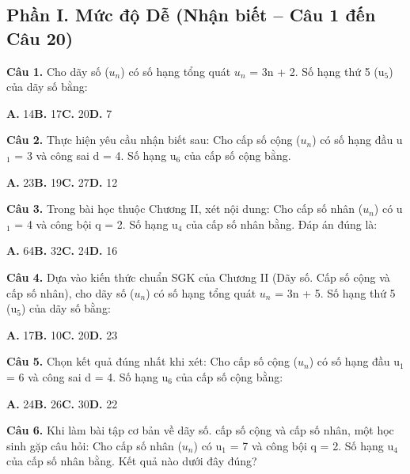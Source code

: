 \documentclass[11pt,a4paper]{article}
\begin{document}
\subsection*{\color{accent} Phần I. Mức độ Dễ (Nhận biết -- Câu 1 đến Câu 20)}
\textbf{\color{primary} Câu 1.} Cho dãy số ($u_n$) có số hạng tổng quát $u_n$ = 3n + 2. Số hạng thứ 5 (u$_5$) của dãy số bằng:\par
\hspace*{1.5em}\textbf{A.} 14\quad\quad \textbf{B.} 17\quad\quad \textbf{C.} 20\quad\quad \textbf{D.} 7\par\vspace{2pt}
\textbf{\color{primary} Câu 2.} Thực hiện yêu cầu nhận biết sau: Cho cấp số cộng ($u_n$) có số hạng đầu u$_1$ = 3 và công sai d = 4. Số hạng u$_6$ của cấp số cộng bằng.\par
\hspace*{1.5em}\textbf{A.} 23\quad\quad \textbf{B.} 19\quad\quad \textbf{C.} 27\quad\quad \textbf{D.} 12\par\vspace{2pt}
\textbf{\color{primary} Câu 3.} Trong bài học thuộc Chương II, xét nội dung: Cho cấp số nhân ($u_n$) có u$_1$ = 4 và công bội q = 2. Số hạng u$_4$ của cấp số nhân bằng. Đáp án đúng là:\par
\hspace*{1.5em}\textbf{A.} 64\quad\quad \textbf{B.} 32\quad\quad \textbf{C.} 24\quad\quad \textbf{D.} 16\par\vspace{2pt}
\textbf{\color{primary} Câu 4.} Dựa vào kiến thức chuẩn SGK của Chương II (Dãy số. Cấp số cộng và cấp số nhân), cho dãy số ($u_n$) có số hạng tổng quát $u_n$ = 3n + 5. Số hạng thứ 5 (u$_5$) của dãy số bằng:\par
\hspace*{1.5em}\textbf{A.} 17\quad\quad \textbf{B.} 10\quad\quad \textbf{C.} 20\quad\quad \textbf{D.} 23\par\vspace{2pt}
\textbf{\color{primary} Câu 5.} Chọn kết quả đúng nhất khi xét: Cho cấp số cộng ($u_n$) có số hạng đầu u$_1$ = 6 và công sai d = 4. Số hạng u$_6$ của cấp số cộng bằng:\par
\hspace*{1.5em}\textbf{A.} 24\quad\quad \textbf{B.} 26\quad\quad \textbf{C.} 30\quad\quad \textbf{D.} 22\par\vspace{2pt}
\textbf{\color{primary} Câu 6.} Khi làm bài tập cơ bản về dãy số. cấp số cộng và cấp số nhân, một học sinh gặp câu hỏi: Cho cấp số nhân ($u_n$) có u$_1$ = 7 và công bội q = 2. Số hạng u$_4$ của cấp số nhân bằng. Kết quả nào dưới đây đúng?\par
\end{document}
